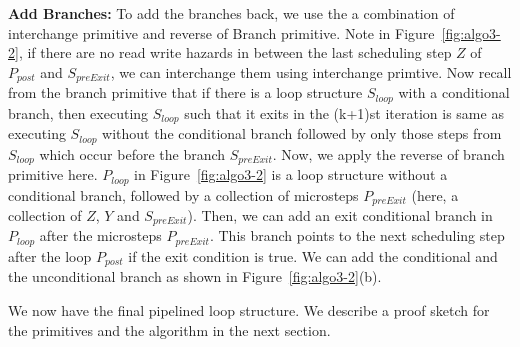 {\bf Add Branches:}  To add the branches back, we use the a combination of interchange primitive and reverse of Branch primitive. Note in Figure~\ref{fig:algo3-2}, if there are no read write hazards in between the last scheduling step $Z$ of $P_{post}$ and $S_{preExit}$, we can interchange them using interchange primtive. Now recall from the branch primitive that if there is a loop structure $S_{loop}$ with a conditional branch, then executing $S_{loop}$ such that it exits in the (k+1)st iteration is same as executing $S_{loop}$ without the conditional branch followed by only those steps from $S_{loop}$ which occur before the branch $S_{preExit}$. Now, we apply the reverse of branch primitive here. $P_{loop}$ in Figure~\ref{fig:algo3-2} is a loop structure without a conditional branch, followed by a collection of microsteps $P_{preExit}$ (here, a collection of $Z$, $Y$ and $S_{preExit}$). Then, we can add an exit conditional branch in $P_{loop}$ after the microsteps $P_{preExit}$. This branch points to the next scheduling step after the loop $P_{post}$ if the exit condition is true. We can add the conditional and the unconditional branch as shown in  Figure~\ref{fig:algo3-2}(b).  

We now have the final pipelined loop structure. We describe a proof sketch for the primitives and the algorithm in the next section.
